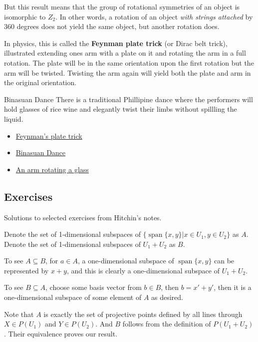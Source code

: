 \documentclass[10pt]{article}
\begin{document}
But this result means that the group of rotational symmetries of an object is
isomorphic to $Z_2$. In other words, a rotation of an object \textit{with
strings attached} by 360 degrees does not yield the same object, but another rotation does. 

In physics, this is called the \textbf{Feynman plate trick} (or Dirac belt trick), illustrated extending ones
arm with a plate on it and rotating the arm in a full rotation. The plate will
be in the same orientation upon the first rotation but the arm will be twisted.
Twisting the arm again will yield both the plate and arm in the original
orientation.

\begin{note}{Binasuan Dance}
	There is a traditional Phillipine dance where the performers will hold glasses
of rice wine and elegantly twist their limbs without spillling the liquid.
\end{note}

\begin{itemize}
	\item{\href{https://en.wikipedia.org/wiki/Plate_trick}{Feynman's plate trick}}
	\item{\href{https://www.youtube.com/watch?v=mOO_IQznZCQ}{Binasuan Dance}}
	\item{\href{https://www.youtube.com/watch?v=fTlbVLGBm3Q}{An arm rotating a glass}}
\end{itemize}

\subsection{Exercises}

Solutions to selected exercises from Hitchin's notes.

\begin{exercise}

	Denote the set of 1-dimensional subspaces of $\{ \operatorname{span} \{x, y\} | x \in U_1,
y \in U_2 \}$ as $A$. Denote the set of 1-dimensional subspaces of $U_1 +
U_2$ as $B$.

To see $A \subseteq B$, for $a \in A$, a one-dimensional subspace of
$\operatorname{span} \{x, y\}$ can be represented by $x + y$, and this is clearly a
one-dimensional subspace of $U_1 + U_2$.

To see $B \subseteq A$, choose some basis vector from $b \in B$, then $b = x'
+ y'$, then it is a one-dimensional subspace of some element of $A$ as
desired.

Note that $A$ is exactly the set of projective points defined by all lines
through $X \in P(U_1)$ and $Y \in P(U_2)$. And $B$ follows from the definition
of $P(U_1 + U_2)$. Their equivalence proves our result.

\end{exercise}
\end{document}

